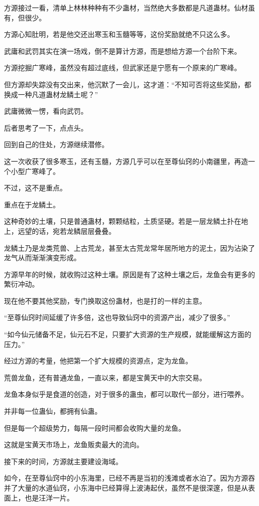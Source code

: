 
\begin{this_body}

方源接过一看，清单上林林种种有不少蛊材，当然绝大多数都是凡道蛊材。仙材虽有，但很少。

方源心知肚明，若是他交还出寒玉和玉髓等等，这份奖励就绝不只这么多。

武庸和武罚其实在演一场戏，倒不是算计方源，而是想给方源一个台阶下来。

方源挖掘广寒峰，虽然没有超过底线，但武家还是宁愿有一个原来的广寒峰。

但方源却失踪没有交出来，他沉默了一会儿，这才道：“不知可否将这些奖励，都换成一种凡道蛊材龙鳞土呢？”

武庸微微一愣，看向武罚。

后者思考了一下，点点头。

回到自己的住处，方源继续潜修。

这一次收获了很多寒玉，还有玉髓，方源几乎可以在至尊仙窍的小南疆里，再造一个小型广寒峰了。

不过，这不是重点。

重点在于龙鳞土。

这种奇妙的土壤，只是普通蛊材，颗颗结粒，土质坚硬。若是一层龙鳞土扑在地上，远望的话，宛若龙鳞层层叠叠。

龙鳞土乃是龙类荒兽、上古荒龙，甚至太古荒龙常年居所地方的泥土，因为沾染了龙气从而渐渐演变形成。

方源早年的时候，就收购过这种土壤。原因是有了这种土壤之后，龙鱼会有更多的繁衍冲动。

现在他不要其他奖励，专门换取这份蛊材，也是打的一样的主意。

“至尊仙窍时间延缓了许多倍，这也导致仙窍中的资源产出，减少了很多。”

“如今仙元储备不足，仙元石不足，只要扩大资源的生产规模，就能缓解这方面的压力。”

经过方源的考量，他把第一个扩大规模的资源点，定为龙鱼。

荒兽龙鱼，还有普通龙鱼，一直以来，都是宝黄天中的大宗交易。

龙鱼本身似乎是食道的创造，对于很多的蛊虫，都可以取代一部分，进行喂养。

并非每一位蛊仙，都拥有仙蛊。

但是每一个超级势力，每隔一段时间都会收购大量的龙鱼。

这就是宝黄天市场上，龙鱼贩卖最大的流向。

接下来的时间，方源就主要建设海域。

如今，在至尊仙窍中的小东海里，已经不再是当初的浅滩或者水泊了。因为方源吞并了大量的水道仙窍，小东海中已经算得上波涛起伏，虽然不是很深邃，但是从表面上，也是汪洋一片。


\end{this_body}
